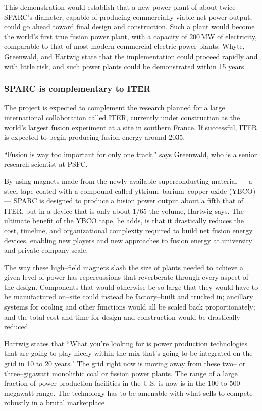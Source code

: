 \documentclass[a4paper,openany,12pt]{report}
\begin{document}
This demonstration would establish that a new power plant of about twice SPARC's diameter, capable of producing commercially viable net power output, could go ahead toward final design and construction. Such a plant would become the world's first true fusion power plant, with a capacity of $200\,$MW of electricity, comparable to that of most modern commercial electric power plants. Whyte, Greenwald, and Hartwig state that the implementation could proceed rapidly and with little risk, and such power plants could be demonstrated within 15 years.

\subsubsection{SPARC is complementary to ITER}

The project is expected to complement the research planned for a large international collaboration called ITER, currently under construction as the world's largest fusion experiment at a site in southern France. If successful, ITER is expected to begin producing fusion energy around 2035.

``Fusion is way too important for only one track," says Greenwald, who is a senior research scientist at PSFC.

By using magnets made from the newly available superconducting material --- a steel tape coated with a compound called yttrium--barium--copper oxide (YBCO) --- SPARC is designed to produce a fusion power output about a fifth that of ITER, but in a device that is only about 1/65 the volume, Hartwig says. The ultimate benefit of the YBCO tape, he adds, is that it drastically reduces the cost, timeline, and organizational complexity required to build net fusion energy devices, enabling new players and new approaches to fusion energy at university and private company scale.  

The way these high--field magnets slash the size of plants needed to achieve a given level of power has repercussions that reverberate through every aspect of the design. Components that would otherwise be so large that they would have to be manufactured on--site could instead be factory--built and trucked in; ancillary systems for cooling and other functions would all be scaled back proportionately; and the total cost and time for design and construction would be drastically reduced.

Hartwig states that ``What you're looking for is power production technologies that are going to play nicely within the mix that's going to be integrated on the grid in 10 to 20 years." The grid right now is moving away from these two-- or three--gigawatt monolithic coal or fission power plants. The range of a large fraction of power production facilities in the U.S. is now is in the 100 to 500 megawatt range. The technology has to be amenable with what sells to compete robustly in a brutal marketplace
\end{document}
